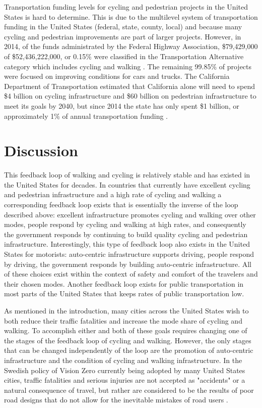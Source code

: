 \documentclass{article}
\begin{document}
Transportation funding levels for cycling and pedestrian projects in the United States is hard to determine. This is due to the multilevel system of transportation funding in the United States (federal, state, county, local) and because many cycling and pedestrian improvements are part of larger projects. However, in 2014, of the funds administrated by the Federal Highway Association, \$79,429,000 of \$52,436,222,000, or 0.15\% were classified in the Transportation Alternative category which includes cycling and walking \citep{fhwaohpi2014}. The remaining 99.85\% of projects were focused on improving conditions for cars and trucks. The California Department of Transportation estimated that California alone will need to spend \$4 billion on cycling infrastructure and \$60 billion on pedestrian infrastructure to meet its goals by 2040, but since 2014 the state has only spent \$1 billion, or approximately 1\% of annual transportation funding  \citep[Page 13, 86]{caltrans2017}.

\section*{Discussion}
This feedback loop of walking and cycling is relatively stable and has existed in the United States for decades. In countries that currently have excellent cycling and pedestrian infrastructure and a high rate of cycling and walking a corresponding feedback loop exists that is essentially the inverse of the loop described above: excellent infrastructure promotes cycling and walking over other modes, people respond by cycling and walking at high rates, and consequently the government responds by continuing to build quality cycling and pedestrian infrastructure. Interestingly, this type of feedback loop also exists in the United States for motorists: auto-centric infrastructure supports driving, people respond by driving, the government responds by building auto-centric infrastructure. All of these choices exist within the context of safety and comfort of the  travelers and their chosen modes. Another feedback loop exists for public transportation in most parts of the United States that keeps rates of public transportation low.

As mentioned in the introduction, many cities across the United States wish to both reduce their traffic fatalities and increase the mode share of cycling and walking. To accomplish either and both of these goals requires changing one of the stages of the feedback loop of cycling and walking. However, the only stages that can be changed independently of the loop are the promotion of auto-centric infrastructure and the condition of cycling and walking infrastructure. In the Swedish policy of Vision Zero currently being adopted by many United States cities, traffic fatalities and serious injuries are  not accepted as "accidents" or a natural consequence of travel, but rather are considered to be the results of poor road designs that do not allow for the inevitable mistakes of road users \citep[Page 2178]{cushing2016}.
\end{document}
